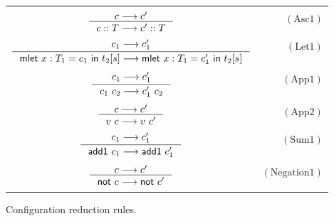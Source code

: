 \documentclass[preprint,authoryear,sort&compress,9pt,nocopyrightspace]{article}
\newcommand\rulename[1]{\mathrm{(#1)}}
\newcommand{\tto}{\longrightarrow}
\newcommand{\ascrip}[1]{#1::T}
\newcommand{\oletP}[3]{\mathsf{mlet} \ x : #1 = #2 \ \mathsf{in}  \ #3}
\newcommand{\negacion}[1]{\mathsf{not} \ #1}
\newcommand{\suma}[1]{\mathsf{add1} \ #1}
\begin{document}
\begin{figure}
\begin{small}
\begin{center}
\begin{tabular}{|c r|}
&\\
$ \inference {c \tto c'}{\ascrip{c} \tto \ascrip{c'} }$&$\rulename{Asc1} $\\
&\\
$ \inference {c_1 \tto c_1'}{\oletP{T_1}{c_1}{t_2[s]} \tto \oletP{T_1}{c_1'}{t_2[s]} }$&$\rulename{Let1} $\\
&\\
$\inference {c_1 \tto c_1'}{c_1 \ c_2 \tto c_1' \ c_2} $&$\rulename{App1}  $\\
&\\
$ \inference {c \tto c'}{v \ c \tto v \ c'}$&$\rulename{App2}  $\\
&\\
$\inference {c_1 \tto c_1'}{\suma{c_1} \tto \suma{c_1'}} $&$\rulename{Sum1}  $\\
&\\
$ \inference {c \tto c'}{\negacion{c} \tto \negacion{c'}}$&$\rulename{Negation1}  $\\
&\\
\hline
\end{tabular}
\caption{Configuration reduction rules.}
\label{tabla:sencilla}
\end{center}
\end{small}
\end{figure}
\end{document}
